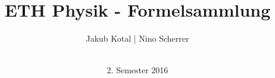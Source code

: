 \documentclass[a4paper, landscape]{article}
\begin{document}
\title{ETH Physik - Formelsammlung}
\date{2. Semester 2016}
\author{ Jakub Kotal | Nino Scherrer\\ \\}
\maketitle










\end{document}
